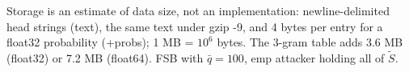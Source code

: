 Storage is an estimate of data size, not an implementation: newline-delimited head strings (text), the same text under gzip -9, and 4 bytes per entry for a float32 probability (+probs); 1 MB = $10^6$ bytes. The 3-gram table adds 3.6 MB (float32) or 7.2 MB (float64). FSB with $\bar q=100$, emp attacker holding all of $\tilde S$.

